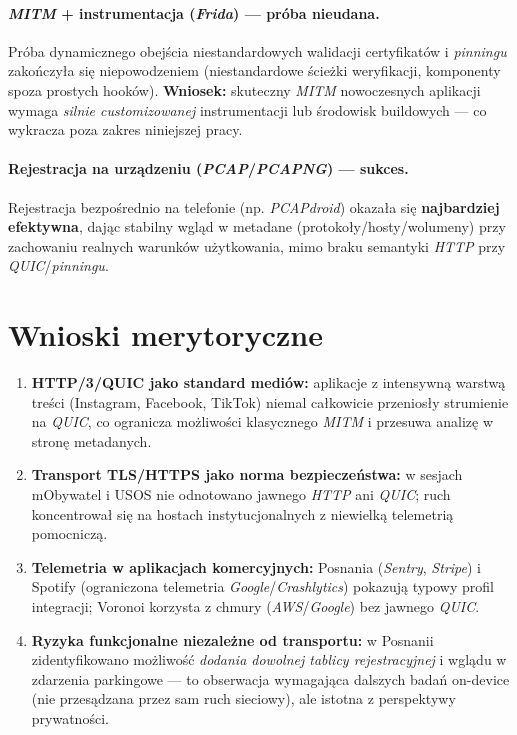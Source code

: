 \paragraph{\emph{MITM} + instrumentacja (\emph{Frida}) — próba nieudana.}
Próba dynamicznego obejścia niestandardowych walidacji certyfikatów i \emph{pinningu} zakończyła się niepowodzeniem (niestandardowe ścieżki weryfikacji, komponenty spoza prostych hooków). \textbf{Wniosek:} skuteczny \emph{MITM} nowoczesnych aplikacji wymaga \emph{silnie customizowanej} instrumentacji lub środowisk buildowych — co wykracza poza zakres niniejszej pracy.

\paragraph{Rejestracja na urządzeniu (\emph{PCAP}/\emph{PCAPNG}) — sukces.}
Rejestracja bezpośrednio na telefonie (np. \emph{PCAPdroid}) okazała się \textbf{najbardziej efektywna}, dając stabilny wgląd w metadane (protokoły/hosty/wolumeny) przy zachowaniu realnych warunków użytkowania, mimo braku semantyki \emph{HTTP} przy \emph{QUIC}/\emph{pinningu}.

\section{Wnioski merytoryczne}

\begin{enumerate}
  \item \textbf{HTTP/3/QUIC jako standard mediów:} aplikacje z intensywną warstwą treści (Instagram, Facebook, TikTok) niemal całkowicie przeniosły strumienie na \emph{QUIC}, co ogranicza możliwości klasycznego \emph{MITM} i przesuwa analizę w stronę metadanych.
  \item \textbf{Transport TLS/HTTPS jako norma bezpieczeństwa:} w sesjach mObywatel i USOS nie odnotowano jawnego \emph{HTTP} ani \emph{QUIC}; ruch koncentrował się na hostach instytucjonalnych z niewielką telemetrią pomocniczą.
  \item \textbf{Telemetria w aplikacjach komercyjnych:} Posnania (\emph{Sentry}, \emph{Stripe}) i Spotify (ograniczona telemetria \emph{Google}/\emph{Crashlytics}) pokazują typowy profil integracji; Voronoi korzysta z chmury (\emph{AWS}/\emph{Google}) bez jawnego \emph{QUIC}.
  \item \textbf{Ryzyka funkcjonalne niezależne od transportu:} w Posnanii zidentyfikowano możliwość \emph{dodania dowolnej tablicy rejestracyjnej} i wglądu w zdarzenia parkingowe — to obserwacja wymagająca dalszych badań on-device (nie przesądzana przez sam ruch sieciowy), ale istotna z perspektywy prywatności.
\end{enumerate}

